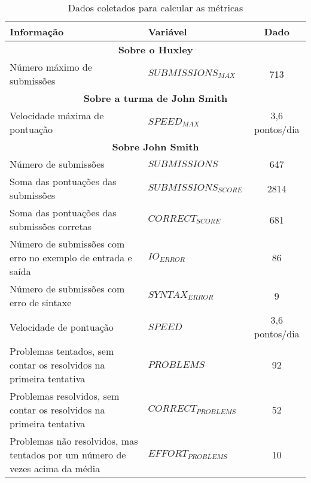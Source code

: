 \begin{table*}[ht]
\footnotesize
\caption{\small Dados coletados para calcular as métricas} 
\addtolength{\tabcolsep}{-3.5pt}
\renewcommand{\arraystretch}{1.5} 
\centering

		\begin{tabular}{|p{9cm}|l|c|}\hline
		
        Informação & Variável & Dado \\\hline\hline
				
				\multicolumn{3}{|c|}{\textbf{Sobre o Huxley}} \\\hline
								
				Número máximo de submissões & $ SUBMISSIONS_{MAX}$	& 713 \\\hline\hline
				
				
				\multicolumn{3}{|c|}{\textbf{Sobre a turma de John Smith}} \\\hline
					
				Velocidade máxima de pontuação &  $ SPEED_{MAX}$ 	& 3,6 pontos/dia \\\hline\hline
				
				
				\multicolumn{3}{|c|}{\textbf{Sobre John Smith}} \\\hline
				
				Número de submissões 												& $ SUBMISSIONS$ 					& 647		\\\hline
				Soma das pontuações das submissões 					& $ SUBMISSIONS_{SCORE}$ 	& 2814	\\\hline
				Soma das pontuações das submissões corretas & $ CORRECT_{SCORE}$		 	& 681 	\\\hline
				
				
				Número de submissões com erro no exemplo de entrada e saída		& $ IO_{ERROR}$				& 86 		\\\hline
				Número de submissões com erro de sintaxe											& $ SYNTAX_{ERROR}$		& 9 		\\\hline
								
				Velocidade de pontuação																				& $ SPEED$						& 3,6 pontos/dia 	\\\hline
				
				Problemas tentados,
				sem contar os resolvidos na primeira tentativa				& $ PROBLEMS$ 								& 92		\\\hline
				Problemas resolvidos,
				sem contar os resolvidos na primeira tentativa				& $ CORRECT_{PROBLEMS}$ 			& 52		\\\hline
				Problemas não resolvidos,
				mas tentados por um número de vezes acima da média		& $ EFFORT_{PROBLEMS}$ 				& 10		\\\hline
				

\end{tabular}
\end{table*}
